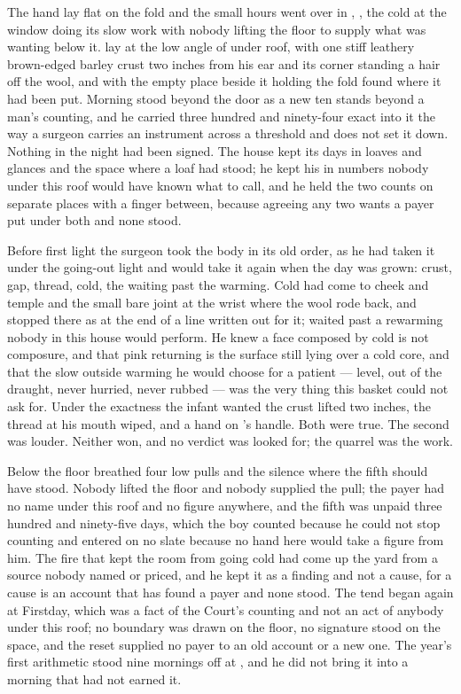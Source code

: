 
The hand lay flat on the fold and the small hours went over  in , , the cold at the window doing its slow work with nobody lifting the floor to supply what was wanting below it.  lay at the low angle of  under  roof, with one stiff leathery brown-edged barley crust two inches from his ear and its corner standing a hair off the wool, and with the empty place beside it holding the fold found where it had been put. Morning stood beyond the door as a new ten stands beyond a man's counting, and he carried three hundred and ninety-four exact into it the way a surgeon carries an instrument across a threshold and does not set it down. Nothing in the night had been signed. The house kept its days in loaves and glances and the space where a loaf had stood; he kept his in numbers nobody under this roof would have known what to call, and he held the two counts on separate places with a finger between, because agreeing any two wants a payer put under both and none stood.

Before first light the surgeon took the body in its old order, as he had taken it under the going-out light and would take it again when the day was grown: crust, gap, thread, cold, the waiting past the warming. Cold had come to cheek and temple and the small bare joint at the wrist where the wool rode back, and stopped there as at the end of a line written out for it;  waited past a rewarming nobody in this house would perform. He knew a face composed by cold is not composure, and that pink returning is the surface still lying over a cold core, and that the slow outside warming he would choose for a patient --- level, out of the draught, never hurried, never rubbed --- was the very thing this basket could not ask for. Under the exactness the infant wanted the crust lifted two inches, the thread at his mouth wiped, and a hand on 's handle. Both were true. The second was louder. Neither won, and no verdict was looked for; the quarrel was the work.

Below the floor  breathed four low pulls and the silence where the fifth should have stood. Nobody lifted the floor and nobody supplied the pull; the payer had no name under this roof and no figure anywhere, and the fifth was unpaid three hundred and ninety-five days, which the boy counted because he could not stop counting and entered on no slate because no hand here would take a figure from him. The fire that kept the room from going cold had come up the yard from a source nobody named or priced, and he kept it as a finding and not a cause, for a cause is an account that has found a payer and none stood. The tend began again at Firstday, which was a fact of the Court's counting and not an act of anybody under this roof; no boundary was drawn on the floor, no signature stood on the space, and the reset supplied no payer to an old account or a new one. The year's first arithmetic stood nine mornings off at , and he did not bring it into a morning that had not earned it.

